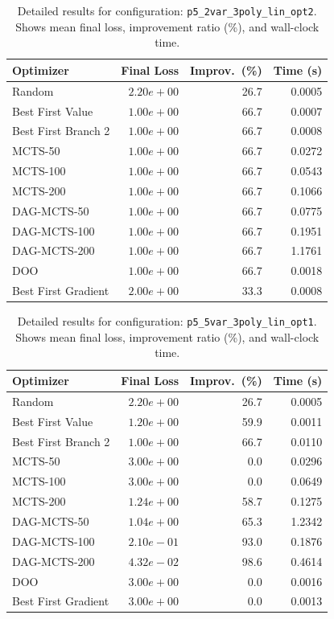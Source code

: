 \begin{table}[H]
\centering
\caption{Detailed results for configuration: \texttt{p5\_2var\_3poly\_lin\_opt2}. Shows mean final loss, improvement ratio (\%), and wall-clock time.}
\label{tab:abssum-detail-32}
\begin{tabular}{lrrr}
\toprule
Optimizer & Final Loss & Improv.~(\%) & Time (s) \\
\midrule
Random & $2.20e+00$ & 26.7 & 0.0005 \\
\hline
Best First Value & \textbf{$1.00e+00$} & 66.7 & 0.0007 \\
\hline
Best First Branch 2 & \textbf{$1.00e+00$} & 66.7 & 0.0008 \\
\hline
MCTS-50 & \textbf{$1.00e+00$} & 66.7 & 0.0272 \\
\hline
MCTS-100 & \textbf{$1.00e+00$} & 66.7 & 0.0543 \\
\hline
MCTS-200 & \textbf{$1.00e+00$} & 66.7 & 0.1066 \\
\hline
DAG-MCTS-50 & \textbf{$1.00e+00$} & 66.7 & 0.0775 \\
\hline
DAG-MCTS-100 & \textbf{$1.00e+00$} & 66.7 & 0.1951 \\
\hline
DAG-MCTS-200 & \textbf{$1.00e+00$} & 66.7 & 1.1761 \\
\hline
DOO & $1.00e+00$ & 66.7 & 0.0018 \\
\hline
Best First Gradient & $2.00e+00$ & 33.3 & 0.0008 \\
\bottomrule
\end{tabular}
\end{table}

\begin{table}[H]
\centering
\caption{Detailed results for configuration: \texttt{p5\_5var\_3poly\_lin\_opt1}. Shows mean final loss, improvement ratio (\%), and wall-clock time.}
\label{tab:abssum-detail-33}
\begin{tabular}{lrrr}
\toprule
Optimizer & Final Loss & Improv.~(\%) & Time (s) \\
\midrule
Random & $2.20e+00$ & 26.7 & 0.0005 \\
\hline
Best First Value & $1.20e+00$ & 59.9 & 0.0011 \\
\hline
Best First Branch 2 & $1.00e+00$ & 66.7 & 0.0110 \\
\hline
MCTS-50 & $3.00e+00$ & 0.0 & 0.0296 \\
\hline
MCTS-100 & $3.00e+00$ & 0.0 & 0.0649 \\
\hline
MCTS-200 & $1.24e+00$ & 58.7 & 0.1275 \\
\hline
DAG-MCTS-50 & $1.04e+00$ & 65.3 & 1.2342 \\
\hline
DAG-MCTS-100 & $2.10e-01$ & 93.0 & 0.1876 \\
\hline
DAG-MCTS-200 & \textbf{$4.32e-02$} & 98.6 & 0.4614 \\
\hline
DOO & $3.00e+00$ & 0.0 & 0.0016 \\
\hline
Best First Gradient & $3.00e+00$ & 0.0 & 0.0013 \\
\bottomrule
\end{tabular}
\end{table}


